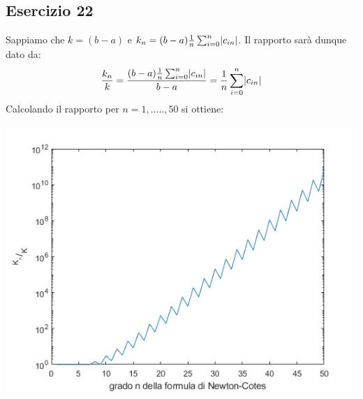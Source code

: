 \subsection{Esercizio 22}
Sappiamo che $k = (b-a)$ e $k_n=(b-a)\frac{1}{n}\sum_{i=0}^{n}\lvert c_{in}\rvert$. Il rapporto sarà dunque dato da: \[\dfrac{k_n}{k} = 
\dfrac{(b-a)\frac{1}{n}\sum_{i=0}^{n}\lvert c_{in}\rvert}{b-a} = \frac{1}{n}\sum_{i=0}^{n}\lvert c_{in}\rvert \]
Calcolando il rapporto per $n = 1,.....,50$ si ottiene:\\\\
    \includegraphics[width = \linewidth]{capitolo5/ncotes.png}

